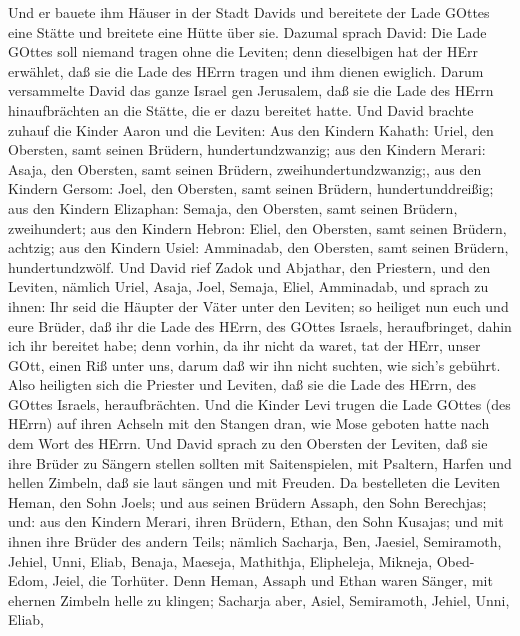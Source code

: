  Und er bauete ihm Häuser in der Stadt Davids und bereitete
der Lade GOttes eine Stätte und breitete eine Hütte über sie.
 Dazumal sprach David: Die Lade GOttes soll niemand tragen
ohne die Leviten; denn dieselbigen hat der HErr erwählet, daß sie die
Lade des HErrn tragen und ihm dienen ewiglich.  Darum
versammelte David das ganze Israel gen Jerusalem, daß sie die Lade des
HErrn hinaufbrächten an die Stätte, die er dazu bereitet hatte.
 Und David brachte zuhauf die Kinder Aaron und die Leviten:
 Aus den Kindern Kahath: Uriel, den Obersten, samt seinen
Brüdern, hundertundzwanzig;  aus den Kindern Merari: Asaja,
den Obersten, samt seinen Brüdern, zweihundertundzwanzig;, 
aus den Kindern Gersom: Joel, den Obersten, samt seinen Brüdern,
hundertunddreißig;  aus den Kindern Elizaphan: Semaja, den
Obersten, samt seinen Brüdern, zweihundert;  aus den Kindern
Hebron: Eliel, den Obersten, samt seinen Brüdern, achtzig; 
aus den Kindern Usiel: Amminadab, den Obersten, samt seinen Brüdern,
hundertundzwölf.  Und David rief Zadok und Abjathar, den
Priestern, und den Leviten, nämlich Uriel, Asaja, Joel, Semaja, Eliel,
Amminadab,  und sprach zu ihnen: Ihr seid die Häupter der
Väter unter den Leviten; so heiliget nun euch und eure Brüder, daß ihr
die Lade des HErrn, des GOttes Israels, heraufbringet, dahin ich ihr
bereitet habe;  denn vorhin, da ihr nicht da waret, tat der
HErr, unser GOtt, einen Riß unter uns, darum daß wir ihn nicht suchten,
wie sich's gebührt.  Also heiligten sich die Priester und
Leviten, daß sie die Lade des HErrn, des GOttes Israels, heraufbrächten.
 Und die Kinder Levi trugen die Lade GOttes (des HErrn) auf
ihren Achseln mit den Stangen dran, wie Mose geboten hatte nach dem Wort
des HErrn.  Und David sprach zu den Obersten der Leviten,
daß sie ihre Brüder zu Sängern stellen sollten mit Saitenspielen, mit
Psaltern, Harfen und hellen Zimbeln, daß sie laut sängen und mit
Freuden.  Da bestelleten die Leviten Heman, den Sohn Joels;
und aus seinen Brüdern Assaph, den Sohn Berechjas; und: aus den Kindern
Merari, ihren Brüdern, Ethan, den Sohn Kusajas;  und mit
ihnen ihre Brüder des andern Teils; nämlich Sacharja, Ben, Jaesiel,
Semiramoth, Jehiel, Unni, Eliab, Benaja, Maeseja, Mathithja, Elipheleja,
Mikneja, Obed-Edom, Jeiel, die Torhüter.  Denn Heman,
Assaph und Ethan waren Sänger, mit ehernen Zimbeln helle zu klingen;
 Sacharja aber, Asiel, Semiramoth, Jehiel, Unni, Eliab,
